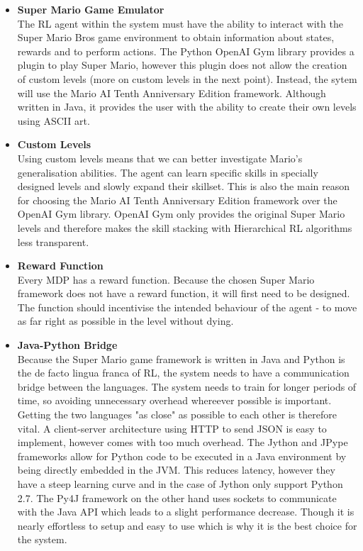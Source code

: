\documentclass[notitlepage,a4paper,11pt]{article}
\begin{document}
\begin{itemize}

	\item \textbf{Super Mario Game Emulator}\\ 
	The RL agent within the system must have the ability to interact with the Super Mario Bros game environment to obtain information about states, rewards and to perform actions. The Python OpenAI Gym library provides a plugin to play Super Mario, however this plugin does not allow the creation of custom levels (more on custom levels in the next point). Instead, the sytem will use the Mario AI Tenth Anniversary Edition \cite{marioai} framework. Although written in Java, it provides the user with the ability to create their own levels using ASCII art.
	
	\item \textbf{Custom Levels}\\
	Using custom levels means that we can better investigate Mario's generalisation abilities. The agent can learn specific skills in specially designed levels and slowly expand their skillset. This is also the main reason for choosing the Mario AI Tenth Anniversary Edition framework over the OpenAI Gym library. OpenAI Gym only provides the original Super Mario levels and therefore makes the skill stacking with Hierarchical RL algorithms less transparent.
	
	\item \textbf{Reward Function}\\
Every MDP has a reward function. Because the chosen Super Mario framework does not have a reward function, it will first need to be designed. The function should incentivise the intended behaviour of the agent - to move as far right as possible in the level without dying.
	
	\item \textbf{Java-Python Bridge}\\
	Because the Super Mario game framework is written in Java and Python is the de facto lingua franca of RL, the system needs to have a communication bridge between the languages. The system needs to train for longer periods of time, so avoiding unnecessary overhead whereever possible is important. Getting the two languages "as close" as possible to each other is therefore vital. A client-server architecture using HTTP to send JSON is easy to implement, however comes with too much overhead. The Jython \cite{jython} and JPype \cite{jpype} frameworks allow for Python code to be executed in a Java environment by being directly embedded in the JVM. This reduces latency, however they have a steep learning curve and in the case of Jython only support Python 2.7. The Py4J \cite{py4j} framework on the other hand uses sockets to communicate with the Java API which leads to a slight performance decrease. Though it is nearly effortless to setup and easy to use which is why it is the best choice for the system.
	

\end{itemize}
\end{document}
